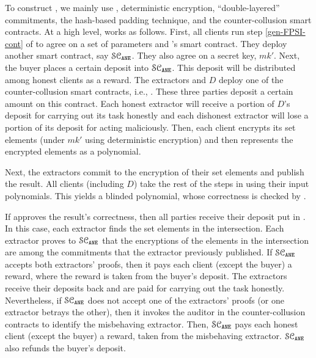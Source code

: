 



To construct  \epsi, we mainly use \fpsi, deterministic encryption, ``double-layered'' commitments, the hash-based padding technique, and the counter-collusion smart contracts. %
%
At a high level, \epsi works as follows. First, all clients run step \ref{gen-FPSI-cont} of \fpsi to agree on a set of parameters and \fpsi's smart contract.  They deploy another smart contract, say $\mathcal{SC}_{\mathtt{ANE}}$. They also agree on a secret key, $mk'$. Next, the buyer places a certain deposit into $\mathcal{SC}_{\mathtt{ANE}}$. This deposit will be distributed among honest clients as a reward. 
%
%
The extractors and $D$ deploy one of the counter-collusion smart contracts, i.e., \SCpc. These three parties deposit a certain amount on this contract.  Each honest extractor will receive a portion of $D$'s deposit for carrying out its task honestly and each dishonest extractor will lose a portion of its deposit for acting maliciously. 
%
Then, each client encrypts its set elements (under $mk'$ using deterministic encryption) and then represents the encrypted elements as a polynomial. %








%
Next, the extractors commit to the encryption of their set elements and publish the result. 
%
All clients (including $D$) take the rest of the steps in \fpsi using their input polynomials. This yields a blinded polynomial,  whose correctness is checked by \scf. 

If  \scf approves the result's correctness, then all parties receive their deposit put  in \scf. In this case, each extractor finds the set elements in the intersection. Each extractor proves to $\mathcal{SC}_{\mathtt{ANE}}$ that the encryptions of the elements in the intersection are among the commitments that the extractor previously published. 
%
If $\mathcal{SC}_{\mathtt{ANE}}$ accepts both extractors' proofs, then it pays each client (except the buyer) a reward, where the reward is taken from the buyer's deposit. The extractors receive their deposits back and are paid for carrying out the task honestly. Nevertheless, if $\mathcal{SC}_{\mathtt{ANE}}$ does not accept one of the extractors' proofs (or one extractor betrays the other), then it invokes the auditor in the counter-collusion contracts to identify the misbehaving extractor.  Then, $\mathcal{SC}_{\mathtt{ANE}}$ pays each honest client (except the buyer) a reward, taken from the misbehaving extractor. $\mathcal{SC}_{\mathtt{ANE}}$ also refunds the buyer's deposit.
%

